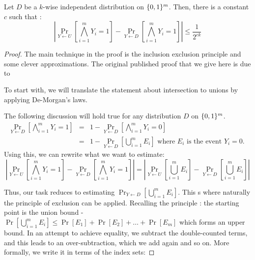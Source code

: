 \begin{theorem}
\label{thm:k-wise-indep-fools-and}
Let $D$ be a $k$-wise independent distribution on $\{0,1\}^m$. Then, there is a constant $c$ such that :
$$\left| \Pr_{Y \leftarrow U} \left[ \bigwedge_{i=1}^m Y_i = 1 \right] - \Pr_{Y \leftarrow D} \left[ \bigwedge_{i=1}^m Y_i = 1 \right] \right| \le \frac{1}{2^{ck}}$$
\end{theorem}
\begin{proof}
The main technique in the proof is the inclusion exclusion principle and some clever approximations. The original published proof that we give here is due to 

To start with, we will translate the statement about intersection to unions by applying De-Morgan's laws.

The following discussion will hold true for any distribution $D$ on $\{0,1\}^m$.
\begin{eqnarray*}
\Pr_{Y \leftarrow D} \left[ \bigwedge_{i=1}^m Y_i = 1 \right] & = & 1 - \Pr_{Y \leftarrow D} \left[ \bigwedge_{i=1}^m Y_i = 0 \right] \\
& = & 1 - \Pr_{Y \leftarrow D} \left[ \bigcup_{i=1}^m E_i \right] \textrm{ where $E_i$ is the event $Y_i = 0$. }
\end{eqnarray*}
Using this, we can rewrite what we want to estimate:
$$\left| \Pr_{Y \leftarrow U} \left[ \bigwedge_{i=1}^m Y_i = 1 \right] - \Pr_{Y \leftarrow D} \left[ \bigwedge_{i=1}^m Y_i = 1 \right] \right| = 
\left| \Pr_{Y \leftarrow U} \left[ \bigcup_{i=1}^m E_i \right] - \Pr_{Y \leftarrow D} \left[ \bigcup_{i=1}^m E_i \right] \right|$$

Thus, our task reduces to estimating $\Pr_{Y \leftarrow D} \left[ \bigcup_{i=1}^m E_i \right]$. This s where naturally the principle of exclusion can be applied. Recalling the principle : the starting point is the union bound - $\Pr \left[ \bigcup_{i=1}^m E_i \right] \le \Pr[E_1]+\Pr[E_2] + \ldots + \Pr[E_m]$ which forms an upper bound. In an attempt to achieve equality, we subtract the double-counted terms, and this leads to an over-subtraction, which we add again and so on. More formally, we write it in terms of the index sets:


\end{proof}
